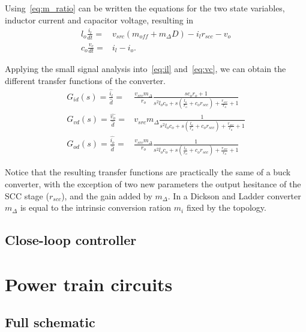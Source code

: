 Using~\eqref{eq:m_ratio} can be written the equations for the two state variables, inductor current and capacitor voltage, resulting in 
\begin{align}
 l_o \frac{i_l}{dt} = &  v_{src} (m_{off} + m_{\Delta} D ) - i_l r_{scc} - v_o \label{eq:il}\\
 c_o \frac{v_c}{dt} = &  i_l - i_o.
 \label{eq:vc}
\end{align}

Applying the small signal analysis into~\eqref{eq:il} and~\eqref{eq:vc}, we can obtain the different transfer functions of the converter.    
\begin{align}
 G_{id}(s) =  \frac{\widehat{i_l}}{\widehat{d}} = &
 \frac{v_{src} m_{\Delta}}{r_o} \frac{s c_o r_o + 1  }
 { s^2 l_o c_o  + s \left ( \frac{l_o}{r_o}  + c_o r_{scc}  \right )  +  \frac{r_{scc}}{r_o} + 1 } \label{eq:g_id}\\
 G_{vd}(s) =  \frac{\widehat{v_o}}{\widehat{d}} = &
 v_{src} m_{\Delta} \frac{ 1  }
 { s^2 l_o c_o  + s \left ( \frac{l_o}{r_o}  + c_o r_{scc}  \right )  +  \frac{r_{scc}}{r_o} + 1 } \label{eq:g_id}\\
 G_{od}(s) =  \frac{\widehat{i_o}}{\widehat{d}} = &
 \frac{v_{src} m_{\Delta}}{r_o} \frac{1  }
 { s^2 l_o c_o  + s \left ( \frac{l_o}{r_o}  + c_o r_{scc}  \right )  +  \frac{r_{scc}}{r_o} + 1 } \label{eq:g_od}
\end{align}

Notice that the resulting transfer functions are practically the same of a buck converter, with the exception of two new parameters the output hesitance of the SCC stage ($r_{scc}$), and the gain added by $m_\Delta$. In a Dickson and Ladder converter $m_\Delta$ is equal to the intrinsic conversion ration $m_i$ fixed by the topology. 

\subsection{Close-loop controller}



\section{Power train circuits}
\subsection{Full schematic}
%

